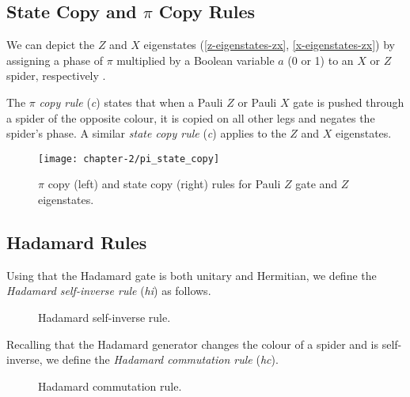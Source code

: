 
\subsection{State Copy and $\pi$ Copy Rules}%

We can depict the $Z$ and $X$ eigenstates (\ref{z-eigenstates-zx}, \ref{x-eigenstates-zx}) by assigning a phase of $\pi$ multiplied by a Boolean variable $a$ (0 or 1) to an $X$ or $Z$ spider, respectively \cite{Wetering2020}.

%

The $\pi$ \textit{copy rule} (\textit{c}) states that when a Pauli $Z$ or Pauli $X$ gate is pushed through a spider of the opposite colour, it is copied on all other legs and negates the spider's phase. A similar \textit{state copy rule} (\textit{c}) applies to the $Z$ and $X$ eigenstates.

\begin{figure}[H]
    \centering
    \texttt{[image: chapter-2/pi\_state\_copy]}
    \caption{$\pi$ copy (left) and state copy (right) rules for Pauli $Z$ gate and $Z$ eigenstates.}
    \label{state-copy}
    \label{pi-copy}
\end{figure}


\subsection{Hadamard Rules}

Using that the Hadamard gate is both unitary and Hermitian, we define the \textit{Hadamard self-inverse rule} (\textit{hi}) as follows.

\begin{figure}[H]
    \centering
    \caption{Hadamard self-inverse rule.}
    \label{hadamard-self-inverse}
\end{figure}

Recalling that the Hadamard generator changes the colour of a spider and is self-inverse, we define the \textit{Hadamard commutation rule} (\textit{hc}).

\begin{figure}[H]
    \centering
    \caption{Hadamard commutation rule.}
    \label{hadamard-commutation}
\end{figure}

